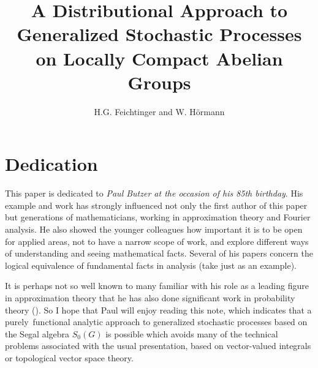 \documentclass[graybox]{svmult}
\begin{document}
\setcounter{chapter}{17}

\title{A Distributional Approach to Generalized Stochastic Processes on Locally Compact Abelian Groups\label{chap18}}


\author{H.G. Feichtinger and W. H\"ormann}



\maketitle

\section*{Dedication}

This paper is dedicated to \textit{Paul Butzer
at the occasion of his 85th birthday}.
His example and work has strongly
influenced not only the first author of this paper but
generations of mathematicians, working in approximation
theory and Fourier analysis. He also showed the younger colleagues
how important it is to be open for applied areas, not to have a
narrow scope of work, and explore different ways of understanding
and seeing mathematical facts. Several of his papers concern the
logical equivalence of fundamental facts in analysis (take
just \cite{burist84} as an example).

It is perhaps not so well known
to many familiar with his role as a leading figure in approximation
theory that he has also done significant work in probability theory (\cite{buhawe75,buha79}).
So I hope that Paul will enjoy reading this note, which indicates
that a purely~functional analytic approach
to generalized stochastic processes based on the Segal
algebra ${S_{0}(G)}$  is possible which avoids many of the technical problems associated with the usual presentation, based on vector-valued integrals
or topological vector space theory.
\end{document}
